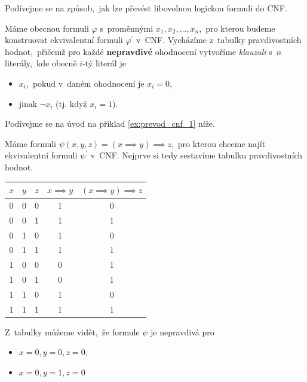 Podívejme se na způsob,~jak lze převést libovolnou logickou formuli do CNF.

Máme obecnou formuli $\varphi$ s~proměnnými $x_1,x_2,\dots,x_n$,~pro kterou budeme konstruovat ekvivalentní formuli $\varphi^\prime$ v~CNF. Vycházíme z~tabulky pravdivostních hodnot,~přičemž pro každé \textbf{nepravdivé} ohodnocení vytvoříme \emph{klauzuli} s~$n$ literály,~kde obecně $i$-tý literál je
\begin{itemize}
    \item $x_i$,~pokud v~daném ohodnocení je $x_i=0$,
    \item jinak $\neg x_i$ (tj. když $x_i=1$).
\end{itemize}
Podívejme se na úvod na příklad \ref{ex:prevod_cnf_1} níže.
\begin{example}\label{ex:prevod_cnf_1}
    Máme formuli $\psi(x,y,z)=(x\implies y)\implies z$,~pro kterou chceme najít ekvivalentní formuli $\psi^\prime$ v~CNF. Nejprve si tedy sestavíme tabulku pravdivostních hodnot.
    \begin{table}[ht]
        \centering
        \begin{tabular}{|c|c|c|c|c|}
        \hline
        $x$ & $y$ & $z$ & $x\implies y$ & $(x\implies y)\implies z$ \\ \hline
        0   & 0   & 0   & 1             & 0                         \\ \hline
        0   & 0   & 1   & 1             & 1                         \\ \hline
        0   & 1   & 0   & 1             & 0                         \\ \hline
        0   & 1   & 1   & 1             & 1                         \\ \hline
        1   & 0   & 0   & 0             & 1                         \\ \hline
        1   & 0   & 1   & 0             & 1                         \\ \hline
        1   & 1   & 0   & 1             & 0                         \\ \hline
        1   & 1   & 1   & 1             & 1                         \\ \hline
        \end{tabular}
    \end{table}
    Z~tabulky můžeme vidět,~že formule $\psi$ je nepravdivá pro
    \begin{itemize}
        \item $x=0,y=0,z=0$,
        \item $x=0,y=1,z=0$

\end{itemize}
\end{example}
